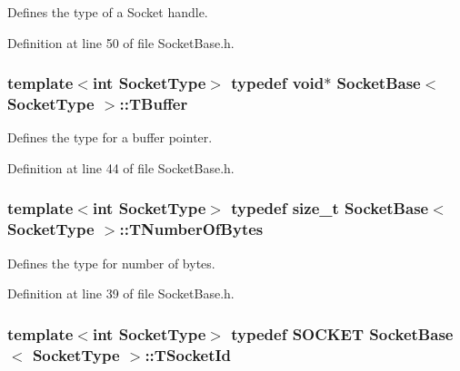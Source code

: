Defines the type of a Socket handle. 



Definition at line 50 of file Socket\-Base.\-h.

\hypertarget{class_socket_base_a1557d64029a25c20b4c306b80efcc143}{
\subsubsection[{T\-Buffer}]{\setlength{\rightskip}{0pt plus 5cm}template$<$int Socket\-Type$>$ typedef void$\ast$ {\bf Socket\-Base}$<$ Socket\-Type $>$\-::{\bf T\-Buffer}}}\label{class_socket_base_a1557d64029a25c20b4c306b80efcc143}


Defines the type for a buffer pointer. 



Definition at line 44 of file Socket\-Base.\-h.

\hypertarget{class_socket_base_ac414903631491453b96e71c06c2c2e72}{
\subsubsection[{T\-Number\-Of\-Bytes}]{\setlength{\rightskip}{0pt plus 5cm}template$<$int Socket\-Type$>$ typedef size\-\_\-t {\bf Socket\-Base}$<$ Socket\-Type $>$\-::{\bf T\-Number\-Of\-Bytes}}}\label{class_socket_base_ac414903631491453b96e71c06c2c2e72}


Defines the type for number of bytes. 



Definition at line 39 of file Socket\-Base.\-h.

\hypertarget{class_socket_base_aad53265037e46768af4d6a0c2ebed277}{
\subsubsection[{T\-Socket\-Id}]{\setlength{\rightskip}{0pt plus 5cm}template$<$int Socket\-Type$>$ typedef {\bf S\-O\-C\-K\-E\-T} {\bf Socket\-Base}$<$ Socket\-Type $>$\-::{\bf T\-Socket\-Id}\hspace{0.3cm}{\ttfamily [protected]}}}\label{class_socket_base_aad53265037e46768af4d6a0c2ebed277}


